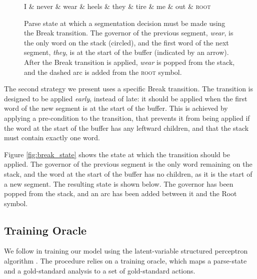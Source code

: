 \documentclass[11pt,letterpaper]{article}
\begin{document}
\begin{figure}
\begin{dependency}[theme=simple, edge unit distance=1.0ex]
    \begin{deptext}[row sep=2.0ex]
        I \& never \& wear \& heels \& they \& tire \& me \& out \& \textsc{root} \\
    \end{deptext}

    \end{dependency}
    \caption{\small Parse state at which a segmentation decision must be made
        using the Break transition.  The governor of the previous segment,
        \emph{wear},  is
        the only word on the stack (circled), and the first word of the
        next segment, \emph{they}, is at the start of the buffer (indicated by
        an arrow). After the Break transition is applied, \emph{wear} is popped
    from the stack, and the dashed arc is added from the \textsc{root} symbol.}
\vspace*{-3em}
\end{figure}
The second strategy we present uses a specific Break transition.  The transition
is designed to be applied \emph{early}, instead of late: it should be applied
when the first word of the new segment is at the start of the buffer.  This is
achieved by applying a pre-condition to the transition, that prevents it from being
applied if the word at the start of the buffer has any
leftward children, and that the stack must contain exactly one word.

Figure \ref{fig:break_state} shows the state at which the transition should
be applied.  The governor of the previous segment is the only word remaining
on the stack, and the word at the start of the buffer has no children, as it
is the start of a new segment.
The resulting state is shown below.  The governor has been popped from the stack,
and an arc has been added between it and the Root symbol. 

\subsection{Training Oracle}

We follow \citet{honnibal:14} in training our model using the latent-variable
structured perceptron algorithm \citep{sun:09}.  The procedure relies on a training
oracle, which maps a parse-state and a gold-standard analysis to a set of gold-standard
actions.
\end{document}
